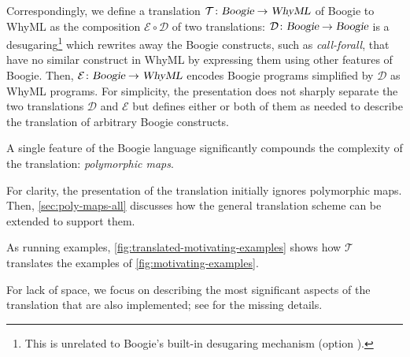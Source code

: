 \documentclass[a4paper,final]{llncs}
\newif\iflong
\newcommand{\tr}{\mathcal{T}}
\newcommand{\enc}{\mathcal{E}}
\newcommand{\des}{\mathcal{D}}
\newcommand{\Boogie}{Boogie\xspace}
\newcommand{\WhyML}{WhyML\xspace}
\newcommand{\Why}{Why3\xspace}
\begin{document}
Correspondingly, we define a translation $\tr \colon \textsl{\Boogie} \to \textsl{\WhyML}$ of \Boogie to \WhyML as the composition $\enc{} \circ \des{}$ of two translations: $\des \colon \textsl{\Boogie} \to \textsl{\Boogie}$ is a desugaring\footnote{This is unrelated to \Boogie's built-in desugaring mechanism (option ).} which rewrites away the \Boogie constructs, such as \emph{call-forall}, that have no similar construct in \WhyML by expressing them using other features of \Boogie.
Then, $\enc \colon \textsl{\Boogie} \to \textsl{\WhyML}$ encodes \Boogie programs simplified by $\des$ as \WhyML programs\iflong, while introducing constraints that ensure that the semantics in \WhyML mirrors the one in \Boogie\fi.
For simplicity, the presentation does not sharply separate the two translations $\des{}$ and $\enc{}$ but defines either or both of them as needed to describe the translation of arbitrary \Boogie constructs.

A single feature of the \Boogie language significantly compounds the complexity of the translation: \emph{polymorphic maps}\iflong, which correspond to mappings between domains of generic type\fi.
\iflong
\Why does support polymorphic maps through a library, but its type system is more restrictive and does not allow the same degree of freedom as \Boogie's in using variables of polymorphic map types.
\fi
For clarity, the presentation of the translation initially ignores polymorphic maps.
Then, \autoref{sec:poly-maps-all} discusses how the general translation scheme can be extended to support them.

As running examples, \autoref{fig:translated-motivating-examples} shows how $\tr$ translates the examples of \autoref{fig:motivating-examples}. 
\iflong
\else
For lack of space, we focus on describing the most significant aspects of the translation that are also implemented; see \cite{extended-version} for the missing details.
\fi
\end{document}
